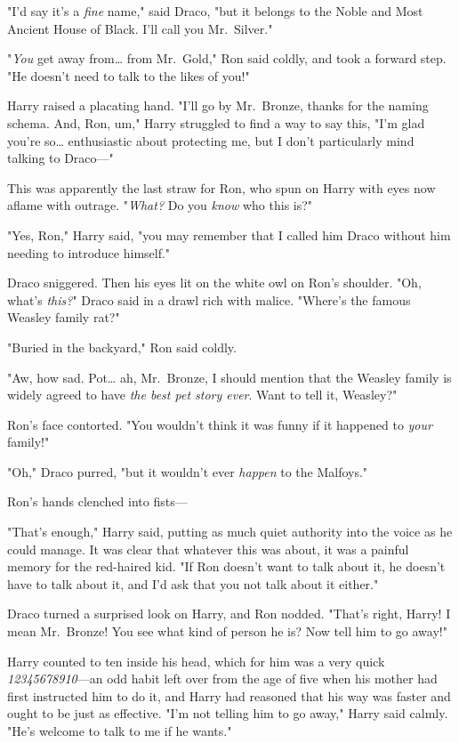 "I'd say it's a \emph{fine} name," said Draco, "but it belongs to the Noble and
Most Ancient House of Black. I'll call you Mr.~Silver."

"\emph{You} get away from{\ldots} from Mr.~Gold," Ron said coldly, and took a
forward step. "He doesn't need to talk to the likes of you!"

Harry raised a placating hand. "I'll go by Mr.~Bronze, thanks for the naming
schema. And, Ron, um," Harry struggled to find a way to say this, "I'm glad
you're so{\ldots} enthusiastic about protecting me, but I don't particularly
mind talking to Draco---"

This was apparently the last straw for Ron, who spun on Harry with eyes now
aflame with outrage. "\emph{What?} Do you \emph{know} who this is?"

"Yes, Ron," Harry said, "you may remember that I called him Draco without him
needing to introduce himself."

Draco sniggered. Then his eyes lit on the white owl on Ron's shoulder. "Oh,
what's \emph{this?}" Draco said in a drawl rich with malice. "Where's the
famous Weasley family rat?"

"Buried in the backyard," Ron said coldly.

"Aw, how sad. Pot{\ldots} ah, Mr.~Bronze, I should mention that the Weasley
family is widely agreed to have \emph{the best pet story ever}. Want to tell
it, Weasley?"

Ron's face contorted. "You wouldn't think it was funny if it happened to
\emph{your} family!"

"Oh," Draco purred, "but it wouldn't ever \emph{happen} to the Malfoys."

Ron's hands clenched into fists---

"That's enough," Harry said, putting as much quiet authority into the voice as
he could manage. It was clear that whatever this was about, it was a painful
memory for the red-haired kid. "If Ron doesn't want to talk about it, he
doesn't have to talk about it, and I'd ask that you not talk about it either."

Draco turned a surprised look on Harry, and Ron nodded. "That's right, Harry! I
mean Mr.~Bronze! You see what kind of person he is? Now tell him to go away!"

Harry counted to ten inside his head, which for him was a very quick
\emph{12345678910}---an odd habit left over from the age of five when his
mother had first instructed him to do it, and Harry had reasoned that his way
was faster and ought to be just as effective. "I'm not telling him to go away,"
Harry said calmly. "He's welcome to talk to me if he wants."

